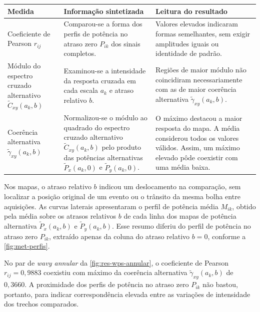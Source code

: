 \begin{quadro}[!htbp]
  \centering
  \begin{threeparttable}
  \caption{Síntese interpretativa das medidas espectrais.}
  \label{quad:disc-medidas-espectrais}
  \small
  \begin{tabular}{>{\raggedright\arraybackslash}p{} >{\raggedright\arraybackslash}p{} >{\raggedright\arraybackslash}p{}}
    \hline
    \textbf{Medida} & \textbf{Informação sintetizada} & \textbf{Leitura do resultado}\\
    \hline
    Coeficiente de Pearson $r_{ij}$ &
    Comparou-se a forma dos perfis de potência no atraso zero $P_{ik}$
    dos sinais completos. &
    Valores elevados indicaram formas semelhantes, sem exigir amplitudes
    iguais ou identidade de padrão.\\
    \hline
    Módulo do espectro cruzado alternativo $\widetilde C_{xy}(a_k,b)$ &
    Examinou-se a intensidade da resposta cruzada em cada escala $a_k$
    e atraso relativo $b$. &
    Regiões de maior módulo não coincidiram necessariamente com as de
    maior coerência alternativa $\widetilde\gamma_{xy}(a_k,b)$.\\
    \hline
    Coerência alternativa $\widetilde\gamma_{xy}(a_k,b)$ &
    Normalizou-se o módulo ao quadrado do espectro cruzado alternativo
    $\widetilde C_{xy}(a_k,b)$ pelo produto das potências alternativas
    $\widetilde P_x(a_k,0)$ e $\widetilde P_y(a_k,0)$. &
    O máximo destacou a maior resposta do mapa. A média considerou todos
    os valores válidos. Assim, um máximo elevado pôde coexistir com uma
    média baixa.\\
    \hline
  \end{tabular}
  \end{threeparttable}
\end{quadro}

Nos mapas, o atraso relativo $b$ indicou um deslocamento na comparação,
sem localizar a posição original de um evento ou o trânsito da mesma bolha
entre aquisições. As curvas laterais apresentaram o perfil de potência
média $M_{ik}$, obtido pela
média sobre os atrasos relativos $b$ de cada linha dos mapas de potência
alternativa $\widetilde P_x(a_k,b)$ e $\widetilde P_y(a_k,b)$.
Esse resumo diferiu do perfil de potência no atraso zero $P_{ik}$,
extraído apenas da coluna do atraso relativo $b=0$, conforme a
\autoref{fig:met-perfis}.

No par de \textit{wavy annular} da \autoref{fig:res-wps-annular}, o coeficiente de Pearson
$r_{ij}=0{,}9883$ coexistiu com máximo da coerência alternativa
$\widetilde\gamma_{xy}(a_k,b)$ de $0{,}3660$.
A proximidade dos perfis de potência no atraso zero $P_{ik}$ não bastou,
portanto, para indicar correspondência elevada entre as variações de
intensidade dos trechos comparados.

